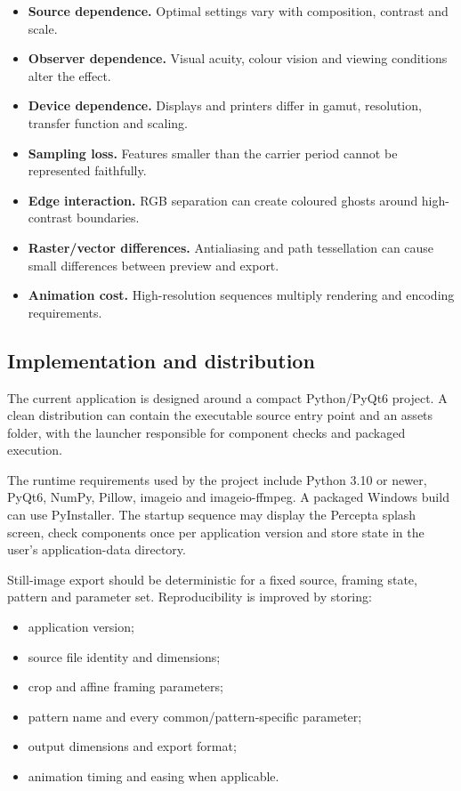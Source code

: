 \begin{itemize}
  \item \textbf{Source dependence.} Optimal settings vary with composition, contrast and scale.
  \item \textbf{Observer dependence.} Visual acuity, colour vision and viewing conditions alter the effect.
  \item \textbf{Device dependence.} Displays and printers differ in gamut, resolution, transfer function and scaling.
  \item \textbf{Sampling loss.} Features smaller than the carrier period cannot be represented faithfully.
  \item \textbf{Edge interaction.} RGB separation can create coloured ghosts around high-contrast boundaries.
  \item \textbf{Raster/vector differences.} Antialiasing and path tessellation can cause small differences between preview and export.
  \item \textbf{Animation cost.} High-resolution sequences multiply rendering and encoding requirements.
\end{itemize}

\subsection{Implementation and distribution}

The current application is designed around a compact Python/PyQt6 project. A clean distribution can contain the executable source entry point and an assets folder, with the launcher responsible for component checks and packaged execution.

The runtime requirements used by the project include Python 3.10 or newer, PyQt6, NumPy, Pillow, imageio and imageio-ffmpeg. A packaged Windows build can use PyInstaller. The startup sequence may display the Percepta splash screen, check components once per application version and store state in the user's application-data directory.

Still-image export should be deterministic for a fixed source, framing state, pattern and parameter set. Reproducibility is improved by storing:

\begin{itemize}
  \item application version;
  \item source file identity and dimensions;
  \item crop and affine framing parameters;
  \item pattern name and every common/pattern-specific parameter;
  \item output dimensions and export format;
  \item animation timing and easing when applicable.
\end{itemize}


